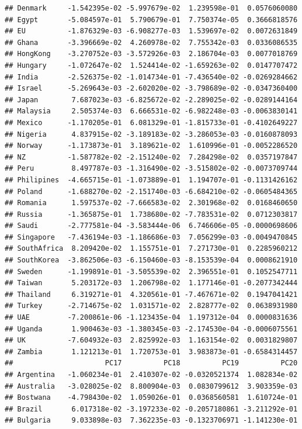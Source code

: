 \documentclass[11pt,preprint, authoryear]{elsarticle}
\numberwithin{equation}{section}
\numberwithin{figure}{section}
\numberwithin{table}{section}
\begin{document}
\begin{verbatim}
## Denmark     -1.542395e-02 -5.997679e-02  1.239598e-01  0.0576060080
## Egypt       -5.084597e-01  5.790679e-01  7.750374e-05  0.3666818576
## EU          -1.876329e-03 -6.908277e-03  1.539697e-02  0.0072631849
## Ghana       -3.396669e-02  4.260978e-02  7.755342e-03  0.0336086535
## HongKong    -3.270752e-03 -3.572926e-03  2.186704e-03  0.0077018769
## Hungary     -1.072647e-02  1.524414e-02 -1.659263e-02  0.0147707472
## India       -2.526375e-02 -1.014734e-01 -7.436540e-02 -0.0269284662
## Israel      -5.269643e-03 -2.602020e-02 -3.798689e-02 -0.0347360400
## Japan        7.687023e-03 -6.825672e-02 -2.289025e-02 -0.0289144164
## Malaysia     2.505374e-03  6.666531e-02 -6.982248e-03 -0.0063830141
## Mexico      -1.170205e-01  6.081329e-01 -1.815733e-01 -0.4102649227
## Nigeria      4.837915e-02 -3.189183e-02 -3.286053e-03 -0.0160878093
## Norway      -1.173873e-01  3.189621e-02  1.610996e-01 -0.0052286520
## NZ          -1.587782e-02 -2.151240e-02  7.284298e-02  0.0357197847
## Peru         8.497787e-03 -1.316490e-02 -3.515802e-02 -0.0073709744
## Philipines  -4.665715e-01 -1.073889e-01  1.194707e-01 -0.1131426162
## Poland      -1.688270e-02 -2.151740e-03 -6.684210e-02 -0.0605484365
## Romania      1.597537e-02 -7.666583e-02  2.301968e-02  0.0168460650
## Russia      -1.365875e-01  1.738680e-02 -7.783531e-02  0.0712303817
## Saudi       -2.777581e-04 -3.583444e-06  6.746606e-05 -0.0000698606
## Singapore   -7.436194e-03 -1.186686e-03  7.056299e-03 -0.0049470845
## SouthAfrica  8.209420e-02  1.155751e-01  7.271730e-01  0.2285960212
## SouthKorea  -3.862506e-03 -6.150460e-03 -8.153539e-04  0.0008621910
## Sweden      -1.199891e-01 -3.505539e-02  2.396551e-01  0.1052547711
## Taiwan       5.203172e-03  1.206798e-02  1.177146e-01 -0.2077342444
## Thailand     6.319271e-01  4.320561e-01 -7.467671e-02  0.1947041421
## Turkey      -2.714675e-02  1.031571e-02  2.828777e-02  0.0638931980
## UAE         -7.200861e-06 -1.123435e-04  1.197312e-04  0.0000831636
## Uganda       1.900463e-03 -1.380345e-03 -2.174530e-04 -0.0006075561
## UK          -7.604932e-03  2.825992e-03  1.163154e-02  0.0031829807
## Zambia       1.121213e-01  1.720753e-01  3.983873e-01 -0.6584314457
##                      PC17          PC18          PC19          PC20
## Argentina   -1.060234e-01  2.410307e-02 -0.0320521374  1.082834e-02
## Australia   -3.028025e-02  8.800904e-03  0.0830799612  3.903359e-03
## Bostwana    -4.798430e-02  1.059026e-01  0.0368560581  1.610724e-01
## Brazil       6.017318e-02 -3.197233e-02 -0.2057180861 -3.211292e-01
## Bulgaria     9.033898e-03  7.362235e-03 -0.1323706971 -1.141230e-01

\end{verbatim}
\end{document}
